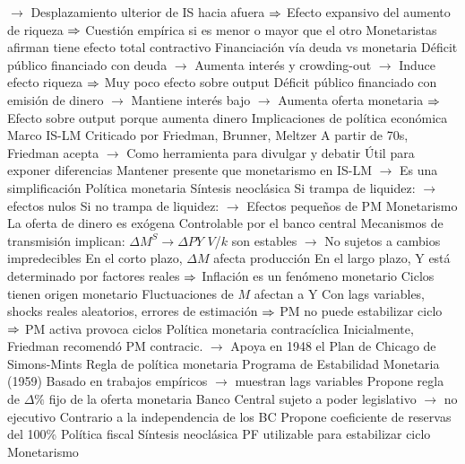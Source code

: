 \documentclass{nuevotema}
\begin{document}
\begin{esquemal}
				\4[] $\to$ Desplazamiento ulterior de IS hacia afuera
				\4[] $\Rightarrow$ Efecto expansivo del aumento de riqueza
				\4[] $\Rightarrow$ Cuestión empírica si es menor o mayor que el otro
				\4[] Monetaristas afirman tiene efecto total contractivo
			\3 Financiación vía deuda vs monetaria
				\4 Déficit público financiado con deuda
				\4[] $\to$ Aumenta interés y crowding-out
				\4[] $\to$ Induce efecto riqueza
				\4[] $\Rightarrow$ Muy poco efecto sobre output
				\4 Déficit público financiado con emisión de dinero
				\4[] $\to$ Mantiene interés bajo
				\4[] $\to$ Aumenta oferta monetaria
				\4[] $\Rightarrow$ Efecto sobre output porque aumenta dinero
		\2 Implicaciones de política económica
			\3 Marco IS-LM
				\4 Criticado por Friedman, Brunner, Meltzer
				\4 A partir de 70s, Friedman acepta
				\4[] $\to$ Como herramienta para divulgar y debatir
				\4 Útil para exponer diferencias
				\4[] Mantener presente que monetarismo en IS-LM
				\4[] $\to$ Es una simplificación
			\3 Política monetaria
				\4 Síntesis neoclásica
				\4[] Si trampa de liquidez:
				\4[] $\to$ efectos nulos
				\4[] 
				\4[] Si no trampa de liquidez:
				\4[] $\to$ Efectos pequeños de PM
				\4 Monetarismo
				\4[] La oferta de dinero es exógena
				\4[] Controlable por el banco central
				\4[] Mecanismos de transmisión implican:
				\4[] $\Delta M^S \to \Delta PY$
				\4[] $V$/$k$ son estables
				\4[] $\to$ No sujetos a cambios impredecibles
				\4[] En el corto plazo, $\Delta M$ afecta producción
				\4[] En el largo plazo, Y está determinado por factores reales
				\4[] $\Rightarrow$ Inflación es un fenómeno monetario
				\4[] 
				\4 Ciclos tienen origen monetario
				\4[] Fluctuaciones de $M$ afectan a Y
				\4[] Con lags variables, shocks reales aleatorios, errores de estimación
				\4[] $\Rightarrow$ PM no puede estabilizar ciclo
				\4[] $\Rightarrow$ PM activa provoca ciclos
				\4 Política monetaria contracíclica
				\4[] Inicialmente, Friedman recomendó PM contracic.
				\4[] $\to$ Apoya en 1948 el Plan de Chicago de Simons-Mints
				\4 Regla de política monetaria
				\4[] Programa de Estabilidad Monetaria (1959)
				\4[] Basado en trabajos empíricos
				\4[] $\to$ muestran lags variables
				\4[] Propone regla de $\Delta \%$ fijo de la oferta monetaria
				\4[] Banco Central sujeto a poder legislativo
				\4[] $\to$ no ejecutivo
				\4[] Contrario a la independencia de los BC
				\4[] Propone coeficiente de reservas del 100\%
			\3 Política fiscal
				\4 Síntesis neoclásica
				\4[] PF utilizable para estabilizar ciclo
				\4 Monetarismo

\end{esquemal}
\end{document}
